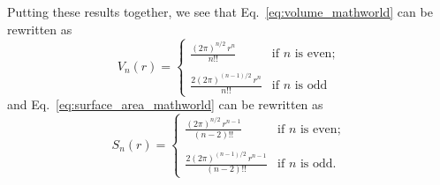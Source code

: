 Putting these results together, we see that Eq.~\eqref{eq:volume_mathworld} can be rewritten as
\begin{equation}
\label{eq:volume_2pi}
V_n(r) = \begin{cases}
 \displaystyle \frac{(2\pi)^{n/2}\,r^n}{n!!} & \text{if } n \text{ is even}; \\ \\
 \displaystyle \frac{2(2\pi)^{(n-1)/2}\,r^n}{n!!} & \text{if } n \text{ is odd}
 \end{cases}
\end{equation}
and Eq.~\eqref{eq:surface_area_mathworld} can be rewritten as
\begin{equation}
\label{eq:surface_area_2pi}
S_n(r) = \begin{cases}
\displaystyle \frac{(2\pi)^{n/2}\,r^{n-1}}{(n-2)!!} & \text{if } n \text{ is even}; \\ \\
\displaystyle \frac{2(2\pi)^{(n-1)/2}\,r^{n-1}}{(n-2)!!} & \text{if } n \text{ is odd.}
\end{cases}
\end{equation}

